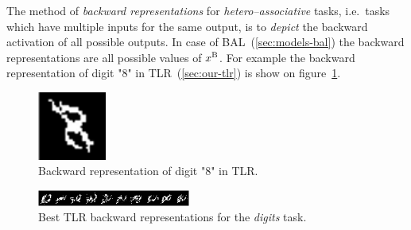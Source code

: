 \label{sec:our-backward-repre}

The method of \emph{backward representations} for \emph{hetero--associative} tasks, i.e.~tasks which have multiple inputs for the same output, is to \emph{depict} the backward activation of all possible outputs. In case of BAL~(\ref{sec:models-bal}) the backward representations are all possible values of $x^{\rm B}$. For example the backward representation of digit "8" in TLR~(\ref{sec:our-tlr}) is show on figure~\ref{fig:our-backward-repre}. 

\begin{figure}[H]
  \centering
  \includegraphics[width=0.2\textwidth]{img/tlr-digit-8.png} %
  \caption{Backward representation of digit "8" in TLR.}
  \label{fig:our-backward-repre}
\end{figure}

\begin{figure}[H]
  \centering
  \includegraphics[width=0.45\textwidth]{img/tlr-digits.png}    
  \caption{Best TLR backward representations for the \emph{digits} task.}
  \label{fig:results-tlr-digits-backward} 
\end{figure}
